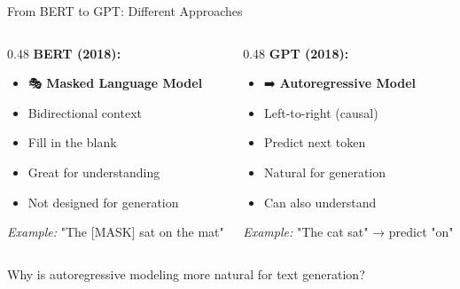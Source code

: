\documentclass[aspectratio=169]{beamer}
\begin{document}
\begin{frame}[shrink=10]{From BERT to GPT: Different Approaches 🔀}
\small
    \begin{columns}[T]
        \begin{column}{0.48\textwidth}
            \textbf{BERT (2018):}
            \begin{itemize}\setlength{\itemsep}{0pt}
                \item 🎭 \textbf{Masked Language Model}
                \item Bidirectional context
                \item Fill in the blank
                \item Great for understanding
                \item Not designed for generation
            \end{itemize}

            \vspace{0.15cm}

            \textit{Example:}
            "The [MASK] sat on the mat"
        \end{column}

        \begin{column}{0.48\textwidth}
            \textbf{GPT (2018):}
            \begin{itemize}\setlength{\itemsep}{0pt}
                \item ➡️ \textbf{Autoregressive Model}
                \item Left-to-right (causal)
                \item Predict next token
                \item Natural for generation
                \item Can also understand
            \end{itemize}

            \vspace{0.15cm}

            \textit{Example:}
            "The cat sat" → predict "on"
        \end{column}
    \end{columns}

    \vspace{0.3cm}

    \begin{thinkaboutit}
        Why is autoregressive modeling more natural for text generation?
    \end{thinkaboutit}
\end{frame}
\end{document}
